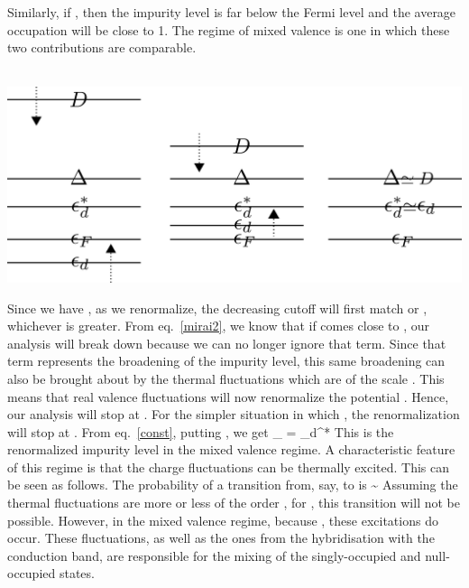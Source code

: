 \documentclass[14pt]{extarticle}
\numberwithin{equation}{section}
\begin{document}
{Similarly, if , then the impurity level is far below the Fermi level and the average occupation will be close to 1.
The regime of mixed valence is one in which these two contributions are comparable.
\\\\
\begin{center} \includegraphics[scale=0.29]{mixed.png} \end{center}
Since we have , as we renormalize, the decreasing cutoff will first match \il{\Delta} or , whichever is greater.
From eq.~\ref{mirai2}, we know that if  comes close to \il{\Delta}, our analysis will break down because we can no longer ignore that term.
Since that term represents the broadening of the impurity level, this same broadening can also be brought about by the thermal fluctuations which are of the scale .
This means that real valence fluctuations will now renormalize the potential .
Hence, our analysis will stop at .
For the simpler situation in which , the renormalization will stop at .
From eq.~\ref{const}, putting , we get
\beq
{}_ = \epsilon_d^*
\eeq
This is the renormalized impurity level in the mixed valence regime.
A characteristic feature of this regime is that the charge fluctuations can be thermally excited.
This can be seen as follows.
The probability of  a transition from, say,  to  is
\beq
\sim {}
\eeq
Assuming the thermal fluctuations are more or less of the order \il{\Delta}, for , this transition will not be possible.
However, in the mixed valence regime, because , these excitations do occur.
These fluctuations, as well as the ones from the hybridisation with the conduction band, are responsible for the mixing of the singly-occupied and null-occupied states.\\\\
}
\end{document}
